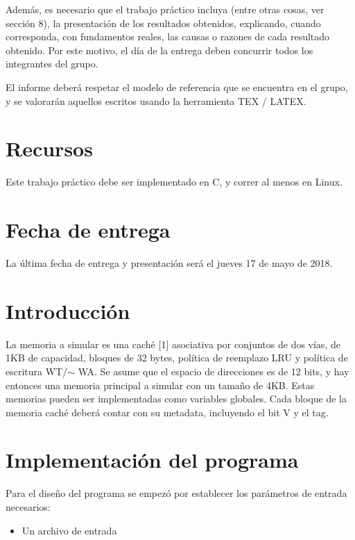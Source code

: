 \documentclass[11pt,a4paper, spanish]{article}
\begin{document}
Además, es necesario que el trabajo práctico incluya (entre otras cosas, ver sección 8), la presentación de los resultados obtenidos, explicando, cuando corresponda, con fundamentos reales, las causas o razones de cada resultado obtenido. Por este motivo, el día de la entrega deben concurrir todos los integrantes del grupo.

El informe deber\'a respetar el modelo de referencia que se encuentra en el grupo, y se valorar\'an aquellos escritos usando la herramienta TEX / LATEX.

\section{Recursos}

Este trabajo práctico debe ser implementado en C, y correr al menos en Linux.

\section{Fecha de entrega}

La última fecha de entrega y presentación ser\'a el jueves 17 de mayo de 2018.

\section{Introducción}\label{informe}
La memoria a simular es una caché [1] asociativa por conjuntos de dos
vías, de 1KB de capacidad, bloques de 32 bytes, política de reemplazo LRU
y política de escritura WT/$\sim$ WA. Se asume que el espacio de direcciones es
de 12 bits, y hay entonces una memoria principal a simular con un tamaño
de 4KB. Estas memorias pueden ser implementadas como variables globales.
Cada bloque de la memoria caché deberá contar con su metadata, incluyendo
el bit V y el tag.


\section{Implementaci\'on del programa}

Para el dise\~no del programa se empez\'o por establecer los par\'ametros de entrada necesarios:

\begin{itemize}
\item Un archivo de entrada
\end{itemize}
\end{document}
